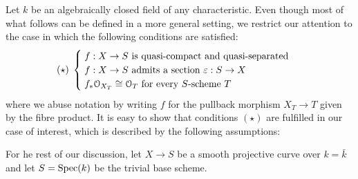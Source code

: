 	Let $k$ be an algebraically closed field of any characteristic. Even though most of what follows can be defined in a more general setting, we restrict our attention to the case in which the following conditions are satisfied:
	$$
		(\star)\;
		\begin{cases}
			\; f:X\to S \text{ is quasi-compact and quasi-separated } \\
			\; f:X\to S \text{ admits a section } \varepsilon:S\to X \\			
			\; f_*\mathcal{O}_{X_T} \cong \mathcal{O}_T \text{ for every $S$-scheme } T \\			
		\end{cases}
	$$
	where we abuse notation by writing $f$ for the pullback morphism $X_T\to T$ given by the fibre product. It is easy to show that conditions $(\star)$ are fulfilled in our case of interest, which is described by the following assumptions:
	\begin{assumption}
		For he rest of our discussion, let $X\to S$ be a smooth projective curve over $k=\bar{k}$ and let $S=\operatorname{Spec}(k)$ be the trivial base scheme.
	\end{assumption}


